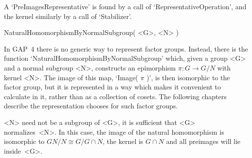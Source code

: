 A     `PreImagesRepresentative'      is   found     by   a       call  of
`RepresentativeOperation', and  the  kernel    similarly by a    call  of
`Stabilizer'.

\stars

\>NaturalHomomorphismByNormalSubgroup( <G>, <N> )

In  {\sf GAP~4}  there  is no  generic  way  to represent factor  groups.
Instead,  there  is   the function  `NaturalHomomorphismByNormalSubgroup'
which,  given  a group   <G>  and a  normal  subgroup <N>,  constructs an
epimorphism $\pi\colon G\to G/N$ with kernel <N>. The  image of this map,
`Image( $\pi$ )', is  then  isomorphic to the  factor  group, but  it  is
represented in a way which makes it convenient to calculate in it, rather
than as a   collection of cosets.  The  following  chapters describe  the
representation {\GAP} chooses for such factor groups.

<N> need  not be    a subgroup   of  <G>,   it  is sufficient   that  <G>
normalizes~<N>. In this  case, the image  of the natural homomorphism  is
isomorphic to $GN/N  \cong G/G\cap N$,  the kernel is  $G\cap N$ and  all
preimages will lie inside~<G>.

